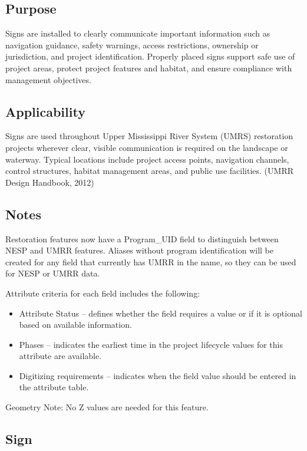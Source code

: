 \documentclass[
  letterpaper,
  DIV=11,
  numbers=noendperiod]{scrreprt}
\providecommand{\tightlist}{%
  \setlength{\itemsep}{0pt}\setlength{\parskip}{0pt}}
\begin{document}
\subsection{Purpose}\label{purpose-27}

Signs are installed to clearly communicate important information such as
navigation guidance, safety warnings, access restrictions, ownership or
jurisdiction, and project identification. Properly placed signs support
safe use of project areas, protect project features and habitat, and
ensure compliance with management objectives.

\subsection{Applicability}\label{applicability-24}

Signs are used throughout Upper Mississippi River System (UMRS)
restoration projects wherever clear, visible communication is required
on the landscape or waterway. Typical locations include project access
points, navigation channels, control structures, habitat management
areas, and public use facilities. (UMRR Design Handbook, 2012)

\subsection{Notes}\label{notes-27}

Restoration features now have a Program\_UID field to distinguish
between NESP and UMRR features. Aliases without program identification
will be created for any field that currently has UMRR in the name, so
they can be used for NESP or UMRR data.

Attribute criteria for each field includes the following:

\begin{itemize}
\tightlist
\item
  Attribute Status -- defines whether the field requires a value or if
  it is optional based on available information.
\item
  Phases -- indicates the earliest time in the project lifecycle values
  for this attribute are available.
\item
  Digitizing requirements -- indicates when the field value should be
  entered in the attribute table.
\end{itemize}

Geometry Note: No Z values are needed for this feature.

\subsection{Sign}\label{sign-1}
\end{document}

